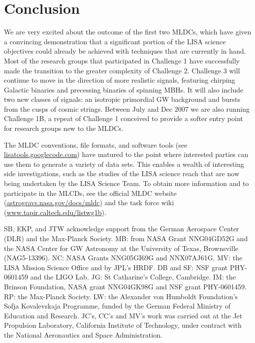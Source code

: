\documentclass{iopart}
\begin{document}
\section{Conclusion}

We are very excited about the outcome of the first two MLDCs, which have given a convincing demonstration that a significant portion of the LISA science objectives could already be achieved with techniques that are currently in hand. Most of the research groups that participated in Challenge 1 have successfully made the transition to the greater complexity of Challenge 2. Challenge 3 will continue to move in the direction of more realistic signals, featuring chirping Galactic binaries and precessing binaries of spinning MBHs. It will also include two new classes of signals: an isotropic primordial GW background and bursts from the cusps of cosmic strings. Between July and Dec 2007 we are also running Challenge 1B, a repeat of Challenge 1 conceived to provide a softer entry point for research groups new to the MLDCs.

The MLDC conventions, file formats, and software tools (see \url{lisatools.googlecode.com}) have matured to the point where interested parties can use them to generate a variety of data sets. This enables a wealth of interesting side investigations, such as the studies of the LISA science reach that are now being undertaken by the LISA Science Team. To obtain more information and to participate in the MLCDs, see the official MLDC website (\url{astrogravs.nasa.gov/docs/mldc}) and the task force wiki (\url{www.tapir.caltech.edu/listwg1b}).


\ack

SB, EKP, and JTW acknowledge support from the German Aerospace Center (DLR) and the Max-Planck Society.
MB: from NASA Grant NNG04GD52G and the NASA Center for GW Astronomy at the University of Texas, Brownsville (NAG5-13396). 
NC: NASA Grants NNG05GI69G and NNX07AJ61G.
MV: the LISA Mission Science Office and by JPL's HRDF.
DB and SF: NSF grant PHY-0601459 and the LIGO Lab.
JG: St Catharine's College, Cambridge.
IM: the Brinson Foundation, NASA grant NNG04GK98G and NSF grant PHY-0601459.
RP: the Max-Planck Society.
LW: the Alexander von Humboldt Foundation's Sofja Kovalevskaja Programme, funded by the German Federal Ministry of Education and Research.
JC's, CC's and MV's work was carried out at the Jet Propulsion Laboratory, California Institute of Technology, under contract with the National Aeronautics and Space Administration.
\end{document}
